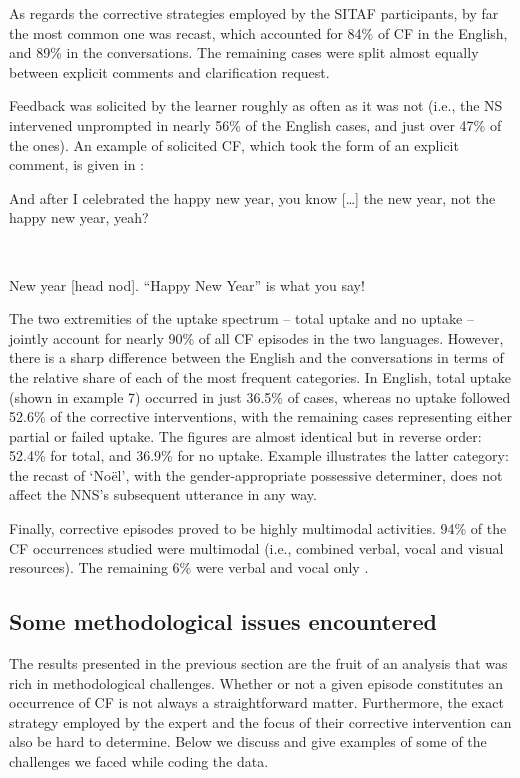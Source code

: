 \documentclass[output=paper,colorlinks,citecolor=brown,modfonts,nonflat]{../langscibook}
\begin{document}
As regards the corrective strategies employed by the SITAF participants, by far the most common one was recast, which accounted for 84\% of CF in the English, and 89\% in the  conversations. The remaining cases were split almost equally between explicit comments and clarification request. 

Feedback was solicited by the learner roughly as often as it was not (i.e., the NS intervened unprompted in nearly 56\% of the English cases, and just over 47\% of the  ones). An example of solicited CF, which took the form of an explicit comment, is given in :

\ea\label{ex:scheuer:8}
{\NNS} \parbox[t]{9cm}{{And} {after} {I} {celebrated} {the} {happy} {new} {year,} {you} {know} {[…]} {the} {new} {year,} {not} {the} {happy} {new} {year,} {yeah?}}\\\smallskip

{\NS} {New} {year} [head nod]. {“Happy} {New} {Year”} {is} {what} {you} {say!}
\z

The two extremities of the uptake spectrum – total uptake and no uptake – jointly account for nearly 90\% of all CF episodes in the two languages. However, there is a sharp difference between the English and the  conversations in terms of the relative share of each of the most frequent categories. In English, total uptake (shown in example 7) occurred in just 36.5\% of cases, whereas no uptake followed 52.6\% of the corrective interventions, with the remaining cases representing either partial or failed uptake. The  figures are almost identical but in reverse order: 52.4\% for total, and 36.9\% for no uptake. Example  illustrates the latter category: the recast of ‘Noël’, with the gender-appropriate possessive determiner, does not affect the NNS’s subsequent utterance in any way.

\largerpage[2]
Finally, corrective episodes proved to be highly multimodal activities. 94\% of the CF occurrences studied were multimodal (i.e., combined verbal, vocal and visual resources). The remaining 6\% were verbal and vocal only \citep{DebrasEtAl2015}. 

\subsection{Some methodological issues encountered}\label{sec:scheuer:4.3}

The results presented in the previous section are the fruit of an analysis that was rich in methodological challenges. Whether or not a given episode constitutes an occurrence of CF is not always a straightforward matter. Furthermore, the exact strategy employed by the expert and the focus of their corrective intervention can also be hard to determine. Below we discuss and give examples of some of the challenges we faced while coding the data.
\end{document}
